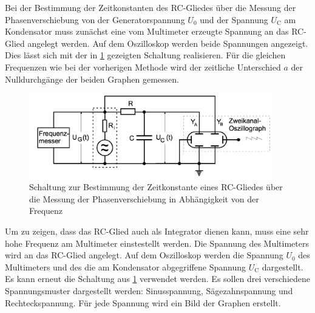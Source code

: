 Bei der Bestimmung der Zeitkonstanten des RC-Gliedes über die Messung der Phasenverschiebung
von der Generatorspannung $U_{\text{0}}$ und der Spannung $U_{\text{C}}$ am Kondensator
muss zunächst eine vom Multimeter erzeugte Spannung an das RC-Glied angelegt werden.
Auf dem Oszilloskop werden beide Spannungen angezeigt. Dies lässt sich mit der in \ref{fig:Schaltung_4c}
gezeigten Schaltung realisieren. Für die gleichen Frequenzen wie bei der vorherigen
Methode wird der zeitliche Unterschied $a$ der Nulldurchgänge der beiden Graphen gemessen.

\begin{figure}
  \centering
  \includegraphics[width=300pt]{4c_schaltung.png}
  \caption{Schaltung zur Bestimmung der Zeitkonstante eines RC-Gliedes über die Messung
  der Phasenverschiebung in Abhängigkeit von der Frequenz \cite{Versuchsanleitung}}
  \label{fig:Schaltung_4c}
\end{figure}

Um zu zeigen, dass das RC-Glied auch als Integrator dienen kann, muss eine sehr hohe
Frequenz am Multimeter einstestellt werden. Die Spannung des Multimeters wird an das
RC-Glied angelegt. Auf dem Oszilloskop werden die Spannung $U_{\text{0}}$ des Multimeters und des
die am Kondensator abgegriffene Spannung $U_{\text{C}}$ dargestellt. Es kann erneut die Schaltung
aus \ref{fig:Schaltung_4c} verwendet werden. Es sollen drei verschiedene
Spannungsmuster dargestellt werden: Sinusspannung, Sägezahnspannung und Rechteckspannung.
Für jede Spannung wird ein Bild der Graphen erstellt.
